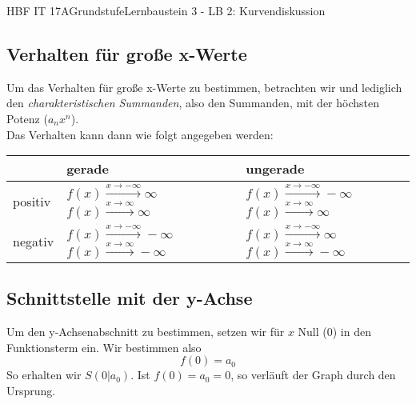 \documentclass[11pt,twocolumn,oneside,openany,headings=optiontotoc,11pt,numbers=noenddot]{article}
\begin{document}
\begin{worksheet}{HBF IT 17A}{Grundstufe}{Lernbaustein 3 - LB 2: Kurvendiskussion}
		\subsection*{Verhalten für große x-Werte} Um das Verhalten für große x-Werte zu bestimmen, betrachten wir und lediglich den \textit{charakteristischen Summanden}, also den Summanden, mit der höchsten Potenz (\(a_nx^n\)).\\
		Das Verhalten kann dann wie folgt angegeben werden:
		\begin{tabular}{|l|L{0.2\textwidth}|L{0.2\textwidth}|}
			\hline
			 & gerade & ungerade\\
			\hline
			positiv &  & \\
			\hline
			negativ &  & \\
			\hline
		\end{tabular}
		\subsection*{Schnittstelle mit der y-Achse} Um den y-Achsenabschnitt zu bestimmen, setzen wir für \(x\) Null (\(0\)) in den Funktionsterm ein. Wir bestimmen also \[f(0) = a_0\]
		So erhalten wir \(S(0|a_0)\). Ist \(f(0) = a_0 = 0\), so verläuft der Graph durch den Ursprung.

\end{worksheet}
\end{document}
